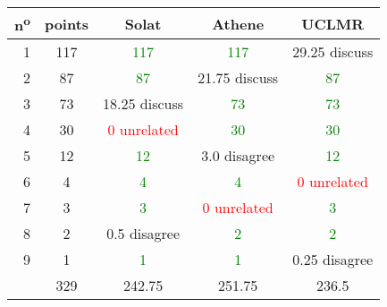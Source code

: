 \begin{center}
 \begin{tabular}{ r | c || c c c }
  n\textsuperscript{o} & points & Solat                        & Athene                       & UCLMR                        \\ \hline
  1                    & 117    & \textcolor{green}{117}       & \textcolor{green}{117}       & 29.25 discuss                \\
  2                    & 87     & \textcolor{green}{87}        & 21.75 discuss                & \textcolor{green}{87}        \\
  3                    & 73     & 18.25 discuss                & \textcolor{green}{73}        & \textcolor{green}{73}        \\
  4                    & 30     & \textcolor{red}{0 unrelated} & \textcolor{green}{30}        & \textcolor{green}{30}        \\
  5                    & 12     & \textcolor{green}{12}        & 3.0 disagree                 & \textcolor{green}{12}        \\
  6                    & 4      & \textcolor{green}{4}         & \textcolor{green}{4}         & \textcolor{red}{0 unrelated} \\
  7                    & 3      & \textcolor{green}{3}         & \textcolor{red}{0 unrelated} & \textcolor{green}{3}         \\
  8                    & 2      & 0.5 disagree                 & \textcolor{green}{2}         & \textcolor{green}{2}         \\
  9                    & 1      & \textcolor{green}{1}         & \textcolor{green}{1}         & 0.25 disagree                \\ \hline
                       & 329    & 242.75                       & 251.75                       & 236.5                        \\
 \end{tabular}
\end{center}
